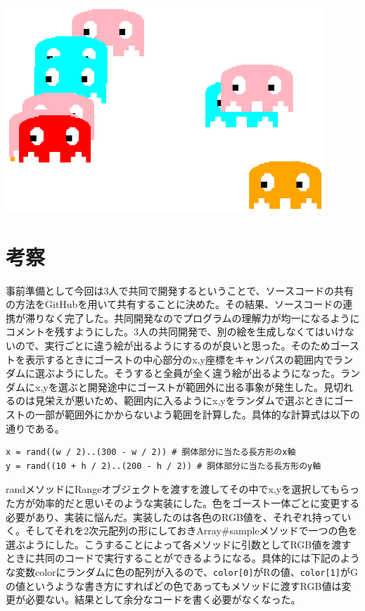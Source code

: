 \documentclass[12pt,a4j]{jarticle}
\begin{document}
\begin{center}
\includegraphics[width=12cm]{packman.ps}
\end{center}

\section{考察}

事前準備として今回は3人で共同で開発するということで、ソースコードの共有の方法をGitHubを用いて共有することに決めた。その結果、ソースコードの連携が滞りなく完了した。共同開発なのでプログラムの理解力が均一になるようにコメントを残すようにした。3人の共同開発で、別の絵を生成しなくてはいけないので、実行ごとに違う絵が出るようにするのが良いと思った。そのためゴーストを表示するときにゴーストの中心部分のx,y座標をキャンパスの範囲内でランダムに選ぶようにした。そうすると全員が全く違う絵が出るようになった。ランダムにx,yを選ぶと開発途中にゴーストが範囲外に出る事象が発生した。見切れるのは見栄えが悪いため、範囲内に入るようにx,yをランダムで選ぶときにゴーストの一部が範囲外にかからないよう範囲を計算した。具体的な計算式は以下の通りである。

\begin{verbatim}
x = rand((w / 2)..(300 - w / 2)) # 胴体部分に当たる長方形のx軸
y = rand((10 + h / 2)..(200 - h / 2)) # 胴体部分に当たる長方形のy軸
\end{verbatim}

randメソッドにRangeオブジェクトを渡すを渡してその中でx,yを選択してもらった方が効率的だと思いそのような実装にした。色をゴースト一体ごとに変更する必要があり、実装に悩んだ。実装したのは各色のRGB値を、それぞれ持っていく。そしてそれを2次元配列の形にしておきArray#sampleメソッドで一つの色を選ぶようにした。こうすることによって各メソッドに引数としてRGB値を渡すときに共同のコードで実行することができるようになる。具体的には下記のような変数colorにランダムに色の配列が入るので、\verb|color[0]|がRの値、\verb|color[1]|がGの値というような書き方にすればどの色であってもメソッドに渡すRGB値は変更が必要ない。結果として余分なコードを書く必要がなくなった。
\end{document}
